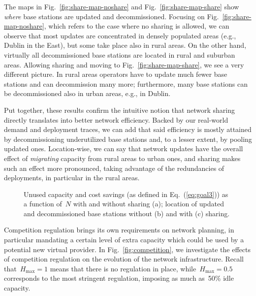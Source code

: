 \documentclass[10pt,journal,cspaper,compsoc]{IEEEtran}
\newcommand{\Fig}[1]{Fig.~\ref{fig:#1}}
\newcommand{\Eq}[1]{Eq.~(\ref{eq:#1})}
\begin{document}
The maps in \Fig{share-map-noshare} and \Fig{share-map-share} show {\em where} base stations are
updated and decommissioned.
Focusing on \Fig{share-map-noshare}, which refers to the case where no sharing
is allowed, we can observe that most updates are concentrated in densely populated areas
(e.g., Dublin in the East), but some take place also in rural areas.
On the other hand, virtually all decommissioned base stations are located in rural and
suburban areas. 
Allowing sharing and moving to \Fig{share-map-share}, we see a very different picture.
In rural areas operators have to update much fewer base stations and can decommission many more;
furthermore,
many base stations can be decommissioned also in urban areas, e.g., in Dublin.

Put together, these results confirm the intuitive notion that network sharing directly translates into better network efficiency.
Backed by our real-world demand and deployment traces, we can add that said efficiency is mostly attained by decommissioning underutilized base stations and, to a lesser extent, by pooling updated ones.
Location-wise, we can say that network updates have the overall effect of {\em migrating} capacity from rural areas to urban ones, and sharing makes such an effect more pronounced, taking advantage of the redundancies of deployments, in particular in the rural areas.

\begin{figure*}[t]
\centering
{}
\caption{
Unused capacity and cost savings (as defined in \Eq{goal3})
as a function of~$N$ with and without sharing (a);
location of updated and decommissioned base stations without (b) and with (c) sharing.
\label{fig:share}
}
\end{figure*}

Competition regulation brings its own requirements on network planning, in particular mandating a certain level
of extra capacity which could be used by a potential new virtual provider.
In \Fig{competition}, we investigate the effects of competition regulation on the evolution of the network infrastructure.
Recall that~$H_{\max}=1$ means that there is no regulation in place, while~$H_{\max}=0.5$ corresponds to the most stringent regulation, imposing as much as~50\% idle capacity.
\end{document}
